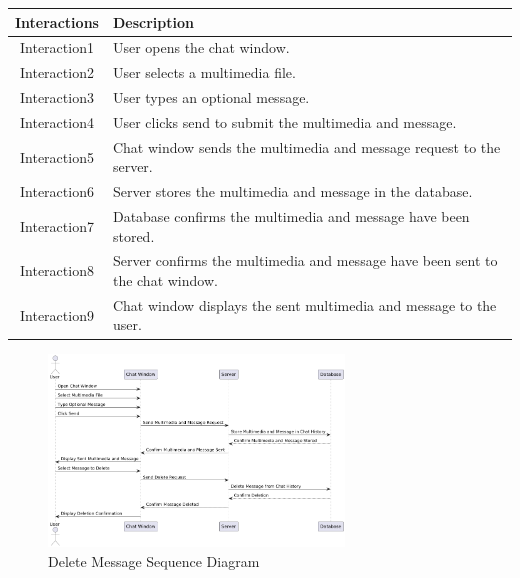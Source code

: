 \begin{longtable}{|c|p{10cm}|}
    \hline
    \textbf{Interactions} & \textbf{Description} \\
    \hline
    Interaction1 & User opens the chat window. \\
    \hline
    Interaction2 & User selects a multimedia file. \\
    \hline
    Interaction3 & User types an optional message. \\
    \hline
    Interaction4 & User clicks send to submit the multimedia and message. \\
    \hline
    Interaction5 & Chat window sends the multimedia and message request to the server. \\
    \hline
    Interaction6 & Server stores the multimedia and message in the database. \\
    \hline
    Interaction7 & Database confirms the multimedia and message have been stored. \\
    \hline
    Interaction8 & Server confirms the multimedia and message have been sent to the chat window. \\
    \hline
    Interaction9 & Chat window displays the sent multimedia and message to the user. \\
    \hline
\end{longtable}
\newpage
\begin{figure}[h]
    \centering
    \includegraphics[width=0.7\textwidth]{images/de;ete_message.png} %
    \caption{Delete Message Sequence Diagram}
    \label{fig:example}
\end{figure}


